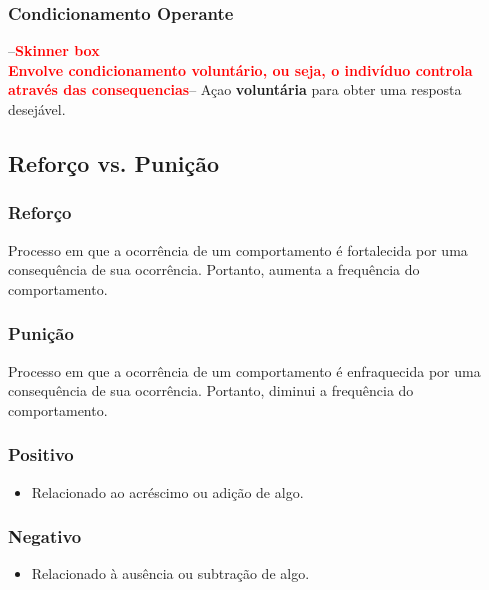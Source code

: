 \documentclass{article}
\newcommand{\todo}[1]{ --\textcolor{red}{\textbf{#1}}--}
\begin{document}
            \subsubsection{Condicionamento Operante}
                
                \todo{Skinner box \\
                Envolve condicionamento voluntário, ou seja, o indivíduo controla através das consequencias}
                Açao \textbf{voluntária} para obter uma resposta desejável.
            
        \subsection{Reforço vs. Punição}
        
            \subsubsection{Reforço}
            
                Processo em que a ocorrência de um comportamento é fortalecida por uma consequência de sua ocorrência. Portanto, aumenta a frequência do comportamento.
            
            \subsubsection{Punição}
            
                Processo em que a ocorrência de um comportamento é enfraquecida por uma consequência de sua ocorrência. Portanto, diminui a frequência do comportamento.
                
            \subsubsection{Positivo}
            
                \begin{itemize}
                    \item Relacionado ao acréscimo ou adição de algo.
                \end{itemize}
            
            \subsubsection{Negativo}
    
                \begin{itemize}
                    \item Relacionado à ausência ou subtração de algo.
                \end{itemize}
            
\end{document}
